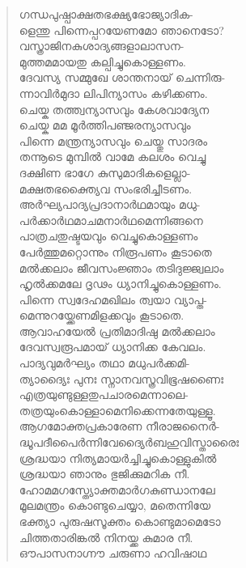 \begin{verse}
ഗന്ധപുഷ്പാക്ഷതഭക്ഷ്യഭോജ്യാദിക-\\
ളെന്തു പിന്നെപ്പറയേണമോ ഞാനെടോ?\\
വസ്ത്രാജിനകുശാദ്യങ്ങളാലാസന-\\
മുത്തമമായതു കല്പിച്ചുകൊള്ളണം.\\
ദേവസ്യ സമ്മുഖേ ശാന്തനായ് ചെന്നിരു-\\
ന്നാവിര്‍മുദാ ലിപിന്യാസം കഴിക്കണം.\\
ചെയ്ക തത്ത്വന്യാസവും കേശവാദ്യേന\\
ചെയ്ക മമ മൂര്‍ത്തിപഞ്ജരന്യാസവും\\
പിന്നെ മന്ത്രന്യാസവും ചെയ്തു സാദരം\\
തന്നൂടെ മുമ്പില്‍ വാമേ കലശം വെച്ചു\\
ദക്ഷിണ ഭാഗേ കുസുമാദികളെല്ലാ-\\
മക്ഷതഭക്ത്യൈവ സംഭരിച്ചീടണം.\\
അര്‍ഘ്യപാദ്യപ്രദാനാര്‍ഥമായും മധു-\\
പര്‍ക്കാര്‍ഥമാചമനാര്‍ഥമെന്നിങ്ങനെ\\
പാത്രചതുഷ്ടയവും വെച്ചുകൊള്ളണം\\
പേര്‍ത്തുമറ്റൊന്നും നിരൂപണം കൂടാതെ\\
മല്‍ക്കലാം ജീവസംജ്ഞാം തടിദുജ്ജ്വലാം\\
ഹൃല്‍ക്കമലേ ദൃഢം ധ്യാനിച്ചുകൊള്ളണം.\\
പിന്നെ സ്വദേഹമഖിലം ത്വയാ വ്യാപ്ത-\\
മെന്നുറയ്ക്കേണമിളക്കവും കൂടാതെ.\\
ആവാഹയേല്‍ പ്രതിമാദിഷു മല്‍ക്കലാം\\
ദേവസ്വരൂപമായ് ധ്യാനിക്ക കേവലം.\\
പാദ്യവുമര്‍ഘ്യം തഥാ മധുപര്‍ക്കമി-\\
ത്യാദ്യൈഃ പുനഃ സ്നാനവസ്ത്രവിഭൂഷണൈഃ\\
എത്രയുണ്ടുള്ളതുപചാരമെന്നാലെ-\\
തത്രയുംകൊള്ളാമെനിക്കെന്നതേയുള്ളൂ.\\
ആഗമോക്തപ്രകാരേണ നീരാജനൈര്‍-\\
ദ്ധൂപദീപൈര്‍ന്നിവേദ്യൈര്‍ബഹുവിസ്താരൈഃ\\
ശ്രദ്ധയാ നിത്യമായര്‍ച്ചിച്ചുകൊള്ളുകില്‍\\
ശ്രദ്ധയാ ഞാനും ഭുജിക്കുമറിക നീ.\\
ഹോമമഗസ്ത്യോക്തമാര്‍ഗകുണ്ഡാനലേ\\
മൂലമന്ത്രം കൊണ്ടുചെയ്യാ, മതെന്നിയേ\\
ഭക്ത്യാ പുരുഷസൂക്തം കൊണ്ടുമാമെടോ\\
ചിത്തതാരിങ്കല്‍ നിനയ്ക്ക കുമാര നീ.\\
ഔപാസനാഗ്നൗ ചരുണാ ഹവിഷാഥ\\

\end{verse}
